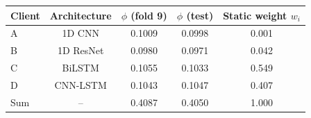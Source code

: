 \begin{tabular}{@{}lcccc@{}}
\toprule
Client & Architecture & $\phi$ (fold 9) & $\phi$ (test) & Static weight $w_i$ \\
\midrule
A & 1D CNN & 0.1009 & 0.0998 & 0.001 \\
B & 1D ResNet & 0.0980 & 0.0971 & 0.042 \\
C & BiLSTM & 0.1055 & 0.1033 & 0.549 \\
D & CNN-LSTM & 0.1043 & 0.1047 & 0.407 \\
\midrule
Sum & -- & 0.4087 & 0.4050 & 1.000 \\
\bottomrule
\end{tabular}
